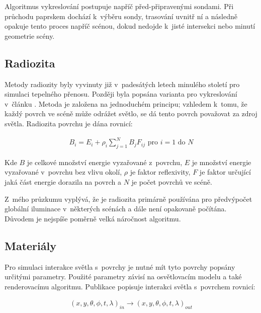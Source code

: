 Algoritmus vykreslování postupuje napříč před-připravenými sondami. Při průchodu paprskem dochází k~výběru sondy, trasování uvnitř ní a následně opakuje tento proces napříč scénou, dokud nedojde k~jisté intersekci nebo minutí geometrie scény.

\subsection{Radiozita}
Metody radiozity byly vyvinuty již v~padesátých letech minulého století pro simulaci tepelného přenosu. Později byla popsána varianta pro vykreslování v~článku \cite{radiosity}. Metoda je založena na jednoduchém principu; vzhledem k~tomu, že každý povrch ve scéně může odrážet světlo, se dá tento povrch považovat za zdroj světla. Radiozita povrchu je dána rovnicí:


\begin{equation} \label{eq:voxel_coords}
	\begin{gathered}
		B_i = E_i + \rho_i \sum^N_{j = 1}B_jF_{ij} \text{ pro } i = 1 \text{ do } N
	\end{gathered}
\end{equation}

Kde $B$ je celkové množství energie vyzařované z~povrchu, $E$ je množství energie vyzařované v~povrchu bez vlivu okolí, $\rho$ je faktor reflexivity, $F$ je faktor určující jaká část energie dorazila na povrch a $N$ je počet povrchů ve scéně.

Z~mého průzkumu vyplývá, že je radiozita primárně používána pro předvýpočet globální iluminace v~některých scénách a dále není opakovaně počítána. Důvodem je nejspíše poměrně velká náročnost algoritmu.

\subsection{Materiály}
Pro simulaci interakce světla s~povrchy je nutné mít tyto povrchy popsány určitými parametry. Použité parametry závisí na osvětlovacím modelu a také renderovacímu algoritmu. Publikace \cite{materials} popisuje interakci světla s~povrchem rovnicí:

\begin{equation} \label{eq:surface_photon}
	\begin{gathered}
		(x, y, \theta, \phi, t, \lambda)_{in} \xrightarrow{} (x, y, \theta, \phi, t, \lambda)_{out}
	\end{gathered}
\end{equation}

